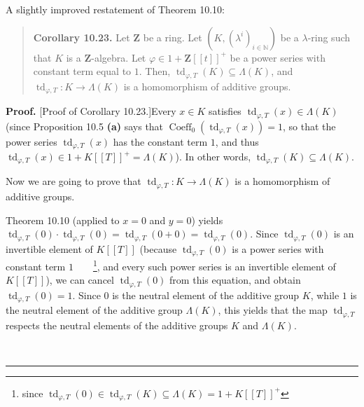 \documentclass[numbers=enddot,12pt,final,onecolumn,notitlepage]{scrartcl}%
\newenvironment{proof}[1][Proof]{\noindent\textbf{#1.} }{\ \rule{0.5em}{0.5em}}
\begin{document}
A slightly improved restatement of Theorem 10.10:

\begin{quote}
\textbf{Corollary 10.23.} Let $\mathbf{Z}$ be a ring. Let $\left(  K,\left(
\lambda^{i}\right)  _{i\in\mathbb{N}}\right)  $ be a $\lambda$-ring such that
$K$ is a $\mathbf{Z}$-algebra. Let $\varphi\in1+\mathbf{Z}\left[  \left[
t\right]  \right]  ^{+}$ be a power series with constant term equal to $1$.
Then, $\operatorname*{td}_{\varphi,T}\left(  K\right)  \subseteq\Lambda\left(
K\right)  $, and $\operatorname*{td}_{\varphi,T}:K\rightarrow\Lambda\left(
K\right)  $ is a homomorphism of additive groups.
\end{quote}

\begin{proof}
[Proof of Corollary 10.23.]Every $x\in K$ satisfies $\operatorname*{td}%
_{\varphi,T}\left(  x\right)  \in\Lambda\left(  K\right)  $ (since Proposition
10.5 \textbf{(a)} says that $\operatorname*{Coeff}\nolimits_{0}\left(
\operatorname*{td}_{\varphi,T}\left(  x\right)  \right)  =1$, so that the
power series $\operatorname*{td}_{\varphi,T}\left(  x\right)  $ has the
constant term $1$, and thus $\operatorname*{td}_{\varphi,T}\left(  x\right)
\in1+K\left[  \left[  T\right]  \right]  ^{+}=\Lambda\left(  K\right)  $). In
other words, $\operatorname*{td}_{\varphi,T}\left(  K\right)  \subseteq
\Lambda\left(  K\right)  $.

Now we are going to prove that $\operatorname*{td}_{\varphi,T}:K\rightarrow
\Lambda\left(  K\right)  $ is a homomorphism of additive groups.

Theorem 10.10 (applied to $x=0$ and $y=0$) yields $\operatorname*{td}%
\nolimits_{\varphi,T}\left(  0\right)  \cdot\operatorname*{td}%
\nolimits_{\varphi,T}\left(  0\right)  =\operatorname*{td}\nolimits_{\varphi
,T}\left(  0+0\right)  =\operatorname*{td}\nolimits_{\varphi,T}\left(
0\right)  $. Since $\operatorname*{td}\nolimits_{\varphi,T}\left(  0\right)  $
is an invertible element of $K\left[  \left[  T\right]  \right]  $ (because
$\operatorname*{td}\nolimits_{\varphi,T}\left(  0\right)  $ is a power series
with constant term $1$\ \ \ \ \footnote{since $\operatorname*{td}%
\nolimits_{\varphi,T}\left(  0\right)  \in\operatorname*{td}\nolimits_{\varphi
,T}\left(  K\right)  \subseteq\Lambda\left(  K\right)  =1+K\left[  \left[
T\right]  \right]  ^{+}$}, and every such power series is an invertible
element of $K\left[  \left[  T\right]  \right]  $), we can cancel
$\operatorname*{td}\nolimits_{\varphi,T}\left(  0\right)  $ from this
equation, and obtain $\operatorname*{td}\nolimits_{\varphi,T}\left(  0\right)
=1$. Since $0$ is the neutral element of the additive group $K$, while $1$ is
the neutral element of the additive group $\Lambda\left(  K\right)  $, this
yields that the map $\operatorname*{td}\nolimits_{\varphi,T}$ respects the
neutral elements of the additive groups $K$ and $\Lambda\left(  K\right)  $.


\end{proof}
\end{document}
